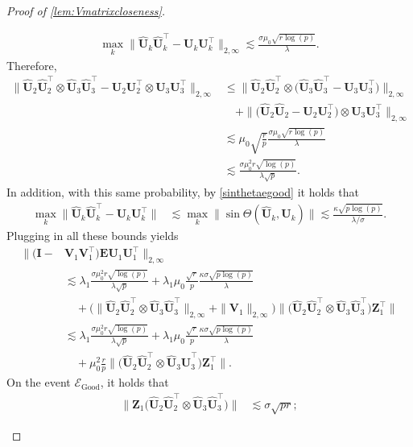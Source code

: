 \documentclass[10pt]{article}
\newcommand{\0}{{\mathbf{0}}}
\newcommand{\1}{{\mathbf{1}}}
\newcommand{\U}{{\mathbf{U}}}
\renewcommand{\t}{^{\top}}
\newcommand{\uhat}{\mathbf{\hat{U}}}
\renewcommand{\hat}{\widehat}
\renewcommand{\hat}{\widehat}
\begin{document}
\begin{proof}[Proof of \cref{lem:Vmatrixcloseness}]
\begin{itemize}
\begin{align*}
    \max_k \| \uhat_k \uhat_k\t - \U_k \U_k\t \|_{2,\infty} \lesssim \frac{\sigma \mu_0 \sqrt{r\log(p)}}{\lambda}.
\end{align*}
Therefore,
\begin{align*}
    \| \uhat_2 \uhat_2\t \otimes \uhat_3\uhat_3\t - \U_2 \U_2\t \otimes \U_3\U_3\t \|_{2,\infty} &\leq \| \uhat_2 \uhat_2\t \otimes \big( \uhat_3 \uhat_3\t - \U_3 \U_3\t \big) \|_{2,\infty} \\
    &\quad + \| \big( \uhat_2 \uhat_2 - \U_2 \U_2\t \big) \otimes \U_3 \U_3\t \|_{2,\infty} \\
    &\lesssim \mu_0 \sqrt{\frac{r}{p}} \frac{\sigma \mu_0 \sqrt{r\log(p)}}{\lambda} \\
    &\lesssim \frac{ \sigma \mu_0^2 r \sqrt{\log(p)}}{\lambda \sqrt{p}}.
\end{align*}
In addition, with this same probability, \textcolor{black}{by \eqref{sinthetaegood}} it holds that
\begin{align*}
    \max_k \| \uhat_k \uhat_k\t - \U_k \U_k\t \| &\lesssim \max_k \|\sin\Theta(\uhat_k,\U_k) \| \lesssim \frac{\kappa \sqrt{p\log(p)}}{\lambda/\sigma}.
\end{align*}
Plugging in all these bounds yields
\begin{align*}
      \| ( \mathbf{I} - &\mathbf{V}_1 \mathbf{V}_1\t ) \mathbf{E} \U_1 \U_1\t \|_{2,\infty} \\
      &\lesssim \lambda_1 \frac{ \sigma \mu_0^2 r \sqrt{\log(p)}}{\lambda \sqrt{p}} + \lambda_1 \mu_0 \frac{\sqrt{r}}{p} \frac{\kappa \sigma \sqrt{p\log(p)}}{\lambda} \\
      &\quad + \bigg(\| \uhat_2 \uhat_2\t \otimes \uhat_3 \uhat_3\t \|_{2,\infty} + \| \mathbf{V}_1 \|_{2,\infty} \bigg) \| \bigg( \uhat_2 \uhat_2\t \otimes \uhat_3 \uhat_3\t \bigg) \mathbf{Z}_1\t \| \\
      &\lesssim \lambda_1 \frac{ \sigma \mu_0^2 r \sqrt{\log(p)}}{\lambda \sqrt{p}} + \lambda_1 \mu_0 \frac{\sqrt{r}}{p} \frac{\kappa \sigma \sqrt{p\log(p)}}{\lambda} \\
      &\quad + \mu_0^2 \frac{r}{p} \| \bigg( \uhat_2 \uhat_2\t \otimes \uhat_3 \uhat_3\t \bigg) \mathbf{Z}_1\t \|.
\end{align*}
On the event $\mathcal{E}_{\mathrm{Good}}$, it holds that
\begin{align*}
     \| \mathbf{Z}_1 \bigg( \uhat_2 \uhat_2\t \otimes \uhat_3 \uhat_3\t \bigg) \| &\lesssim \sigma\sqrt{pr};
     \end{align*}

\end{itemize}
\end{proof}
\end{document}
